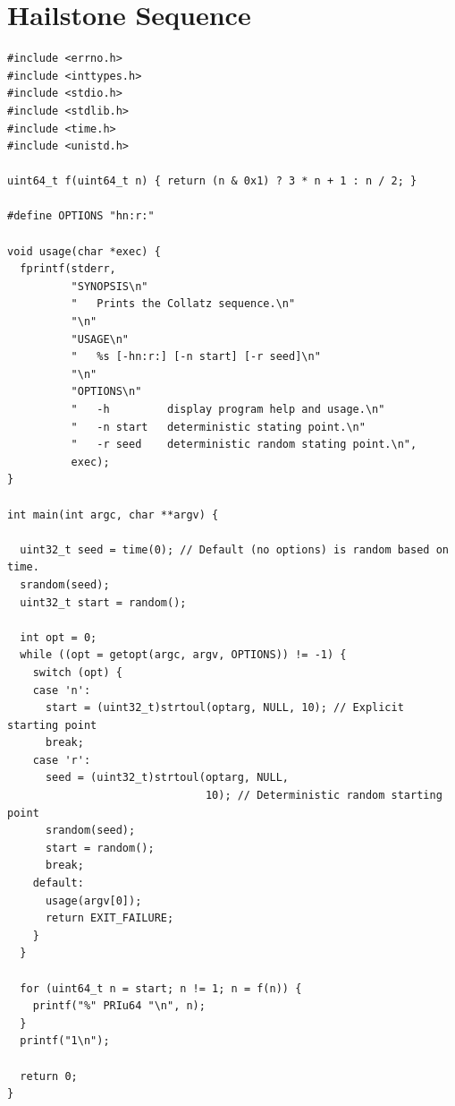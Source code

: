 \documentclass[11pt]{article}
\begin{document}
\appendix
\newpage\section{Hailstone Sequence}
\begin{verbatim}
#include <errno.h>
#include <inttypes.h>
#include <stdio.h>
#include <stdlib.h>
#include <time.h>
#include <unistd.h>

uint64_t f(uint64_t n) { return (n & 0x1) ? 3 * n + 1 : n / 2; }

#define OPTIONS "hn:r:"

void usage(char *exec) {
  fprintf(stderr,
          "SYNOPSIS\n"
          "   Prints the Collatz sequence.\n"
          "\n"
          "USAGE\n"
          "   %s [-hn:r:] [-n start] [-r seed]\n"
          "\n"
          "OPTIONS\n"
          "   -h         display program help and usage.\n"
          "   -n start   deterministic stating point.\n"
          "   -r seed    deterministic random stating point.\n",
          exec);
}

int main(int argc, char **argv) {

  uint32_t seed = time(0); // Default (no options) is random based on time.
  srandom(seed);
  uint32_t start = random();

  int opt = 0;
  while ((opt = getopt(argc, argv, OPTIONS)) != -1) {
    switch (opt) {
    case 'n':
      start = (uint32_t)strtoul(optarg, NULL, 10); // Explicit starting point
      break;
    case 'r':
      seed = (uint32_t)strtoul(optarg, NULL,
                               10); // Deterministic random starting point
      srandom(seed);
      start = random();
      break;
    default:
      usage(argv[0]);
      return EXIT_FAILURE;
    }
  }

  for (uint64_t n = start; n != 1; n = f(n)) {
    printf("%" PRIu64 "\n", n);
  }
  printf("1\n");

  return 0;
}
\end{verbatim}
\end{document}
